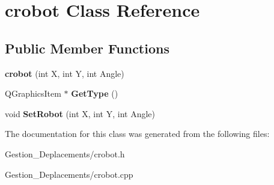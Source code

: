 \section{crobot Class Reference}
\label{classcrobot}
\subsection*{Public Member Functions}
\begin{DoxyCompactItemize}
\item 
{\bfseries crobot} (int X, int Y, int Angle)\label{classcrobot_ab52a9bee95e1a9332c95362f7cbaabba}

\item 
Q\-Graphics\-Item $\ast$ {\bfseries Get\-Type} ()\label{classcrobot_a806d7430d838aa3ef1aca73ca90cdac3}

\item 
void {\bfseries Set\-Robot} (int X, int Y, int Angle)\label{classcrobot_ae49f9348cf518ce038a94b8be23c4403}

\end{DoxyCompactItemize}


The documentation for this class was generated from the following files\-:\begin{DoxyCompactItemize}
\item 
Gestion\-\_\-\-Deplacements/crobot.\-h\item 
Gestion\-\_\-\-Deplacements/crobot.\-cpp\end{DoxyCompactItemize}
